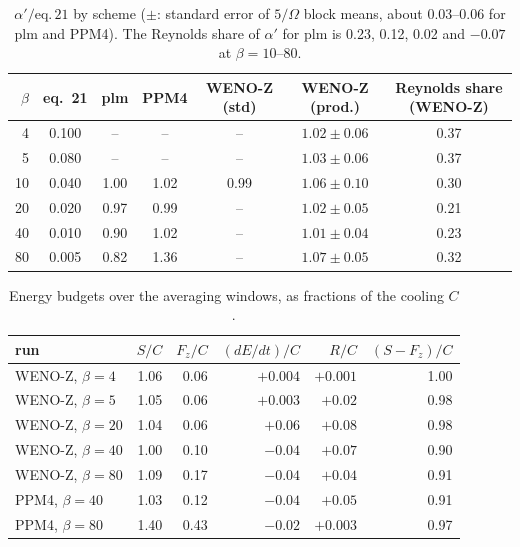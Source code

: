 \documentclass[11pt]{article}
\newcommand{\Om}{\Omega}
\begin{document}
\begin{table}[H]
\centering\small
\begin{tabular}{rcccccc}
\toprule
$\beta$ & eq.~21 & plm & PPM4 & WENO-Z (std) & WENO-Z (prod.) & Reynolds share (WENO-Z) \\
\midrule
4  & 0.100  & --    & --    & --    & $1.02\pm0.06$ & 0.37 \\
5  & 0.080  & --    & --    & --    & $1.03\pm0.06$ & 0.37 \\
10 & 0.040  & 1.00  & 1.02  & 0.99  & $1.06\pm0.10$ & 0.30 \\
20 & 0.020  & 0.97  & 0.99  & --    & $1.02\pm0.05$ & 0.21 \\
40 & 0.010  & 0.90  & 1.02  & --    & $1.01\pm0.04$ & 0.23 \\
80 & 0.005  & 0.82  & 1.36  & --    & $1.07\pm0.05$ & 0.32 \\
\bottomrule
\end{tabular}
\caption{$\alpha'/\mathrm{eq.\,21}$ by scheme ($\pm$: standard error of $5/\Om$ block means,
about 0.03--0.06 for plm and PPM4). The Reynolds share of $\alpha'$ for plm is 0.23, 0.12,
0.02 and $-0.07$ at $\beta = 10$--80.}
\end{table}

\begin{table}[H]
\centering\small
\begin{tabular}{lrrrrr}
\toprule
run & $S/C$ & $F_z/C$ & $(dE/dt)/C$ & $R/C$ & $(S-F_z)/C$ \\
\midrule
WENO-Z, $\beta = 4$  & 1.06 & 0.06 & $+0.004$ & $+0.001$ & 1.00 \\
WENO-Z, $\beta = 5$  & 1.05 & 0.06 & $+0.003$ & $+0.02$  & 0.98 \\
WENO-Z, $\beta = 20$ & 1.04 & 0.06 & $+0.06$  & $+0.08$  & 0.98 \\
WENO-Z, $\beta = 40$ & 1.00 & 0.10 & $-0.04$  & $+0.07$  & 0.90 \\
WENO-Z, $\beta = 80$ & 1.09 & 0.17 & $-0.04$  & $+0.04$  & 0.91 \\
PPM4, $\beta = 40$   & 1.03 & 0.12 & $-0.04$  & $+0.05$  & 0.91 \\
PPM4, $\beta = 80$   & 1.40 & 0.43 & $-0.02$  & $+0.003$ & 0.97 \\
\bottomrule
\end{tabular}
\caption{Energy budgets over the averaging windows, as fractions of the cooling $C$.}
\end{table}
\end{document}
